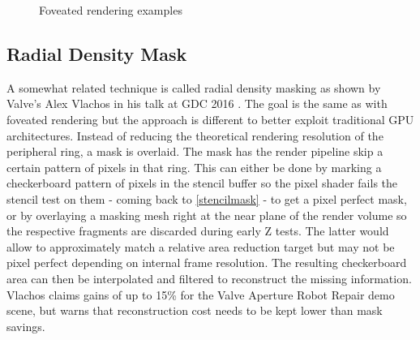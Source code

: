 \begin{figure}[H]
  \centering
     \hfill
     \caption{Foveated rendering examples}
     \label{fig:FovRendering}
\end{figure}

\subsection{Radial Density Mask}
A somewhat related technique is called radial density masking as shown by Valve's Alex Vlachos in his talk at GDC 2016 \cite{Vlachos.2016c}. The goal is the same as with foveated rendering but the approach is different to better exploit traditional GPU architectures. Instead of reducing the theoretical rendering resolution of the peripheral ring, a mask is overlaid. The mask has the render pipeline skip a certain pattern of pixels in that ring. This can either be done by marking a checkerboard pattern of pixels in the stencil buffer so the pixel shader fails the stencil test on them - coming back to \autoref{stencilmask} - to get a pixel perfect mask, or by overlaying a masking mesh right at the near plane of the render volume so the respective fragments are discarded during early Z tests. The latter would allow to approximately match a relative area reduction target but may not be pixel perfect depending on internal frame resolution. The resulting checkerboard area can then be interpolated and filtered to reconstruct the missing information. Vlachos claims gains of up to 15\% for the Valve Aperture Robot Repair demo scene, but warns that reconstruction cost needs to be kept lower than mask savings. 

